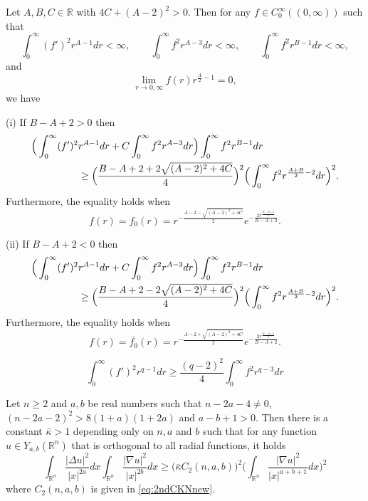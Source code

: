 \documentclass[10pt,a4paper]{amsart}
\def\R{\mathbb R}%
\def\irn{\int_{\R^n}}
\begin{document}
\begin{lemma}\label{modelineq}
Let $A, B, C \in \R$ with $4C + (A-2)^2 >0$. Then for any $f \in C_0^\infty((0,\infty))$ such that
\[
\int_0^\infty (f')^2 r^{A -1} dr < \infty,\qquad \int_0^\infty f^2 r^{A -3} dr < \infty, \qquad \int_0^\infty f^2 r^{B-1} dr < \infty,
\]
and 
\[
\lim_{r\to 0, \infty} f(r) r^{\frac A2 -1} = 0,
\]
we have
\begin{description}
\item(i) If $B-A+2 > 0$ then
\begin{align}\label{eq:model1}
\Big(\int_0^\infty (f')^2& r^{A -1} dr + C \int_0^\infty f^2 r^{A -3} dr\Big) \int_0^\infty f^2 r^{B-1} dr\notag\\
&\geq  \Big(\frac{B-A+2 + 2\sqrt{(A-2)^2 + 4C}}4\Big)^2 \Big(\int_0^\infty f^2 r^{\frac{A+B}2-2} dr\Big)^2.
\end{align}
Furthermore, the equality holds when 
\begin{equation}\label{eq:extre1}
f(r)=f_0(r) = r^{-\frac{A-2 - \sqrt{(A-2)^2 + 4C}}2} e^{-\frac{2r^{\frac{B-A+2}2}}{B-A+2}}.
\end{equation}
\item(ii) If $B-A+2 < 0$ then
\begin{align}\label{eq:model2}
\Big(\int_0^\infty (f')^2& r^{A -1} dr + C \int_0^\infty f^2 r^{A -3} dr\Big) \int_0^\infty f^2 r^{B-1} dr\notag\\
&\geq  \Big(\frac{B-A+2 - 2\sqrt{(A-2)^2 + 4C}}4\Big)^2 \Big(\int_0^\infty f^2 r^{\frac{A+B}2-2} dr\Big)^2.
\end{align}
Furthermore, the equality holds when 
\begin{equation}\label{eq:extre2}
f(r)=\bar{f_0}(r) = r^{-\frac{A-2 +\sqrt{(A-2)^2 + 4C}}2} e^{-\frac{2r^{\frac{B-A+2}2}}{B-A+2}}.
\end{equation}
\end{description}
\end{lemma}

\begin{equation}\label{eq:1DHardy}
\int_0^\infty (f')^2 r^{q-1} dr \geq \frac{(q-2)^2}4 \int_0^\infty f^2 r^{q-3} dr
\end{equation}

\begin{lemma}\label{Improved2ndCKN1}
Let $n\geq 2$ and $a, b$ be real numbers such that $n-2a -4\not=0$, $(n-2a -2)^2 > 8(1+a)(1+2a)$ and $a-b +1 >0$. Then there is a constant ${\bar{\kappa} >1}$ depending only on $n, a$ and $b$ such that for any function $u\in Y_{a,b}(\R^n)$ that is orthogonal to all radial functions, it holds
\begin{equation*}%
\irn \frac{|\Delta u|^2}{|x|^{2a}} dx \irn \frac{|\nabla u|^2}{|x|^{2b}} dx \geq \Big(\bar{\kappa} C_2(n,a,b)\Big)^2 \Big(\irn \frac{|\nabla u|^2}{|x|^{a+b +1}} dx\Big)^2
\end{equation*}
where $C_2(n,a,b)$ is given in \eqref{eq:2ndCKNnew}.
\end{lemma}
\end{document}
